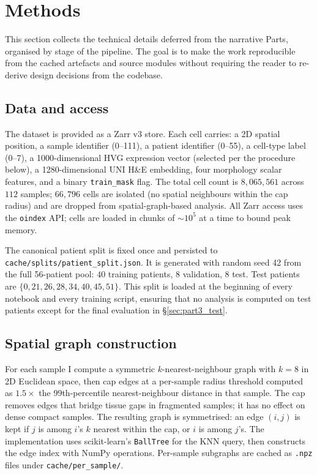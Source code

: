 \section{Methods}
\label{sec:methods}

This section collects the technical details deferred from the narrative Parts, organised by stage of the pipeline. The goal is to make the work reproducible from the cached artefacts and source modules without requiring the reader to re-derive design decisions from the codebase.

\subsection*{Data and access}

The dataset is provided as a Zarr v3 store. Each cell carries: a 2D spatial position, a sample identifier (0--111), a patient identifier (0--55), a cell-type label (0--7), a 1000-dimensional HVG expression vector (selected per the procedure below), a 1280-dimensional UNI \cite{uni2024} H\&E embedding, four morphology scalar features, and a binary \texttt{train\_mask} flag. The total cell count is $8{,}065{,}561$ across $112$ samples; $66{,}796$ cells are isolated (no spatial neighbours within the cap radius) and are dropped from spatial-graph-based analysis. All Zarr access uses the \texttt{oindex} API; cells are loaded in chunks of $\sim 10^5$ at a time to bound peak memory.

The canonical patient split is fixed once and persisted to \texttt{cache/splits/patient\_split.json}. It is generated with random seed 42 from the full 56-patient pool: $40$ training patients, $8$ validation, $8$ test. Test patients are $\{0, 21, 26, 28, 34, 40, 45, 51\}$. This split is loaded at the beginning of every notebook and every training script, ensuring that no analysis is computed on test patients except for the final evaluation in \S\ref{sec:part3_test}.

\subsection*{Spatial graph construction}

For each sample I compute a symmetric $k$-nearest-neighbour graph with $k = 8$ in 2D Euclidean space, then cap edges at a per-sample radius threshold computed as $1.5\times$ the 99th-percentile nearest-neighbour distance in that sample. The cap removes edges that bridge tissue gaps in fragmented samples; it has no effect on dense compact samples. The resulting graph is symmetrised: an edge $(i,j)$ is kept if $j$ is among $i$'s $k$ nearest within the cap, or $i$ is among $j$'s. The implementation uses scikit-learn's \texttt{BallTree} for the KNN query, then constructs the edge index with NumPy operations. Per-sample subgraphs are cached as \texttt{.npz} files under \texttt{cache/per\_sample/}.

